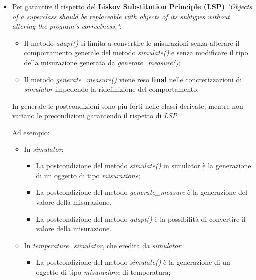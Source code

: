 \begin{itemize}
\begin{itemize}
    \end{itemize}
    \item Per garantire il rispetto del \textbf{Liskov Substitution Principle (LSP)} \textit{"Objects of a superclass should be replaceable with objects of its subtypes without altering the program's correctness."}:
    \begin{itemize}
        \item Il metodo \textit{adapt()} si limita a convertire le misurazioni senza alterare il comportamento generale del metodo \textit{simulate()} e senza modificare il tipo della misurazione generata da \textit{generate\_measure()};
        
        \item Il metodo \textit{generate\_measure()} viene reso \textbf{final} nelle concretizzazioni di \textit{simulator} impedendo la ridefinizione del comportamento.
    \end{itemize}

    In generale le postcondizioni sono piu forti nelle classi derivate, mentre non variano le precondizioni garantendo il rispetto di \textit{LSP}.
    
    Ad esempio:

    \begin{itemize}
        \item In \textit{simulator}:

        \begin{itemize}
            \item La postcondizione del metodo \textit{simulate()} in simulator è la generazione di un oggetto di tipo \textit{misurazione};
            
            \item La postcondizione del metodo \textit{generate\_measure} è la generazione del valore della misurazione.
            
            \item La postcondizione del metodo \textit{adapt()} è la possibilità di convertire il valore della misurazione.
        \end{itemize}

        \item In \textit{temperature\_simulator}, che eredita da \textit{simulator}:
        \begin{itemize}
            \item La postcondizione del metodo \textit{simulate()} è la generazione di un oggetto di tipo \textit{misurazione} di temperatura;
            

\end{itemize}
\end{itemize}
\end{itemize}
